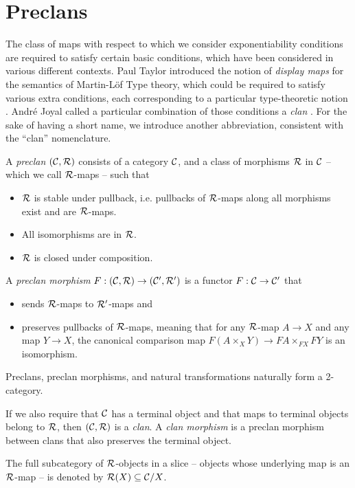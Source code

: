 \section{Preclans}

The class of maps with respect to which we consider exponentiability conditions
are required to satisfy certain basic conditions,
which have been considered in various different contexts.
Paul Taylor introduced the notion of \emph{display maps}
for the semantics of Martin-L\"of Type theory,
which could be required to satisfy various extra conditions,
each corresponding to a particular type-theoretic notion
\cite{taylor1987}.
Andr\'e Joyal called a particular combination of those conditions
a \emph{clan} \cite{joyal2017}.
For the sake of having a short name,
we introduce another abbreviation,
consistent with the ``clan'' nomenclature.

\begin{definition}\label{def:preclan}
  A \emph{preclan} $(\mathcal{C},\mathcal{R})$ consists of a category $\mathcal{C}$,
  and a class of morphisms $\mathcal{R}$ in $\mathcal{C}$
  -- which we call $\mathcal{R}$-maps -- such that 
  \begin{itemize}
    \item $\mathcal{R}$ is stable under pullback,
      i.e. pullbacks of $\mathcal{R}$-maps along all morphisms exist and are $\mathcal{R}$-maps.
    \item All isomorphisms are in $\mathcal{R}$.
    \item $\mathcal{R}$ is closed under composition.
  \end{itemize}
  A \emph{preclan morphism} 
  $F : (\mathcal{C}, \mathcal{R}) \to (\mathcal{C}', \mathcal{R}')$ is a functor
  $F : \mathcal{C} \to \mathcal{C}'$ that
  \begin{itemize}
    \item sends $\mathcal{R}$-maps to $\mathcal{R}'$-maps and
    \item preserves pullbacks of $\mathcal{R}$-maps,
    meaning that for any $\mathcal{R}$-map $A \to X$
    and any map $Y \to X$,
    the canonical comparison map
    $F (A \times_X Y) \to F A \times_{F X} F Y$
    is an isomorphism.
  \end{itemize}
\end{definition}
Preclans, preclan morphisms,
and natural transformations naturally form a 2-category.

If we also require that $\mathcal{C}$ has a terminal object
and that maps to terminal objects belong to $\mathcal{R}$,
then $(\mathcal{C},\mathcal{R})$ is a \emph{clan}.
A \emph{clan morphism} is a preclan morphism between clans
that also preserves the terminal object.

The full subcategory of $\mathcal{R}$-objects in a slice
-- objects whose underlying map is an $\mathcal{R}$-map -- is denoted by
$\mathcal{R}(X) \subseteq \mathcal{C} / X$.

